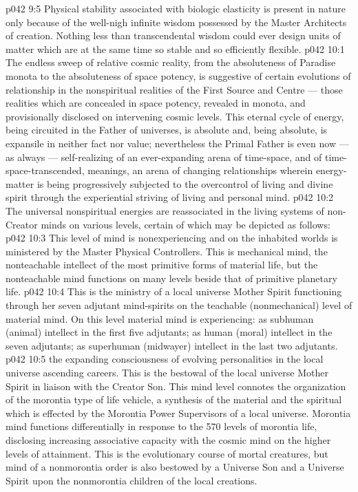 \vs p042 9:5 Physical stability associated with biologic elasticity is present in nature only because of the well\hyp{}nigh infinite wisdom possessed by the Master Architects of creation. Nothing less than transcendental wisdom could ever design units of matter which are at the same time so stable and so efficiently flexible.
\vs p042 10:1 The endless sweep of relative cosmic reality, from the absoluteness of Paradise monota to the absoluteness of space potency, is suggestive of certain evolutions of relationship in the nonspiritual realities of the First Source and Centre --- those realities which are concealed in space potency, revealed in monota, and provisionally disclosed on intervening cosmic levels. This eternal cycle of energy, being circuited in the Father of universes, is absolute and, being absolute, is expansile in neither fact nor value; nevertheless the Primal Father is even now --- as always --- self\hyp{}realizing of an ever\hyp{}expanding arena of time\hyp{}space, and of time\hyp{}space\hyp{}transcended, meanings, an arena of changing relationships wherein energy\hyp{}matter is being progressively subjected to the overcontrol of living and divine spirit through the experiential striving of living and personal mind.
\vs p042 10:2 The universal nonspiritual energies are reassociated in the living systems of non\hyp{}Creator minds on various levels, certain of which may be depicted as follows:
\vs p042 10:3 \bibnobreakspace {} This level of mind is nonexperiencing and on the inhabited worlds is ministered by the Master Physical Controllers. This is mechanical mind, the nonteachable intellect of the most primitive forms of material life, but the nonteachable mind functions on many levels beside that of primitive planetary life.
\vs p042 10:4 \bibnobreakspace {} This is the ministry of a local universe Mother Spirit functioning through her seven adjutant mind\hyp{}spirits on the teachable (nonmechanical) level of material mind. On this level material mind is experiencing: as subhuman (animal) intellect in the first five adjutants; as human (moral) intellect in the seven adjutants; as superhuman (midwayer) intellect in the last two adjutants.
\vs p042 10:5 \bibnobreakspace {} the expanding consciousness of evolving personalities in the local universe ascending careers. This is the bestowal of the local universe Mother Spirit in liaison with the Creator Son. This mind level connotes the organization of the morontia type of life vehicle, a synthesis of the material and the spiritual which is effected by the Morontia Power Supervisors of a local universe. Morontia mind functions differentially in response to the 570 levels of morontia life, disclosing increasing associative capacity with the cosmic mind on the higher levels of attainment. This is the evolutionary course of mortal creatures, but mind of a nonmorontia order is also bestowed by a Universe Son and a Universe Spirit upon the nonmorontia children of the local creations.
